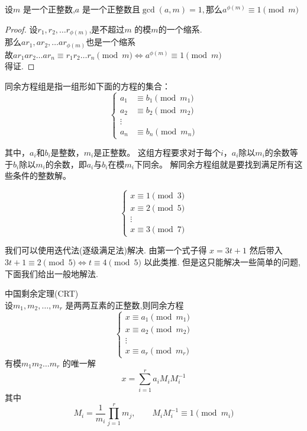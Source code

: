 \begin{theorem}
  设$m$ 是一个正整数,$a$ 是一个正整数且$\gcd(a,m)=1,那么a^{\phi(m)} \equiv 1 \pmod{m}$
\end{theorem}

\begin{proof}
  设$r_1,r_2,\dots r_{\phi(m)}$,是不超过$m$ 的模$m$的一个缩系.\\
那么$ar_1,ar_2,\dots ar_{\phi(m)}$也是一个缩系\\
故$ar_1ar_2\dots ar_n \equiv r_1r_2\dots r_n \pmod{m} \iff a^{\phi(m)} \equiv 1 \pmod{m}$\\
得证.
\end{proof}

\begin{definition}
  同余方程组是指一组形如下面的方程的集合：
$$
\begin{cases}
a_1 &\equiv b_1 \pmod{m_1} \\
a_2 &\equiv b_2 \pmod{m_2} \\
\vdots \\
a_n &\equiv b_n \pmod{m_n}
\end{cases}
$$

其中，$a_i$和$b_i$是整数，$m_i$是正整数。
这组方程要求对于每个$i$，$a_i$除以$m_i$的余数等于$b_i$除以$m_i$的余数，即$a_i$与$b_i$在模$m_i$下同余。
解同余方程组就是要找到满足所有这些条件的整数解。
\end{definition}

\begin{example}
  $$
\begin{cases}
x \equiv 1 \pmod{3} \\
x \equiv 2 \pmod{5} \\
\vdots \\
x \equiv 3 \pmod{7}
\end{cases}
$$

我们可以使用迭代法(逐级满足法)解决.
由第一个式子得 $x=3t+1$
然后带入$3t+1 \equiv 2 \pmod{5} \iff t \equiv 4\pmod{5}$
以此类推.
但是这只能解决一些简单的问题,下面我们给出一般地解法.
\end{example}


\begin{theorem}
  中国剩余定理(CRT)\\
  设$m_1,m_2,\dots ,m_r$ 是两两互素的正整数,则同余方程
$$
\begin{cases}
x \equiv a_1 \pmod{m_1} \\
x \equiv a_2 \pmod{m_2} \\
\vdots \\
x \equiv a_r \pmod{m_r}
\end{cases}
$$
有模$m_1m_2\dots m_r$ 的唯一解
$$
x=\sum_{i=1}^{r} a_iM_iM_i^{-1} 
$$
其中
$$
M_i= \frac{1}{m_i}\prod_{j=1}^r m_j ,\qquad M_iM_i^{-1} \equiv 1 \pmod{m_i}
$$
\end{theorem}

